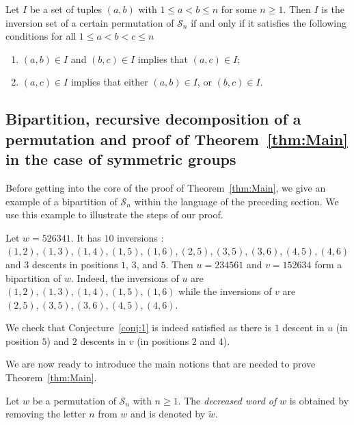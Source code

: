\documentclass[Unicode]{cedram-alco}
\theoremstyle{definition}
\newcommand{\Sym}[1]{\mathcal{S}_{#1}}
\newcommand{\Symn}{\Sym{n}}
\newcommand{\dec}[1]{\widetilde{#1}}
\begin{document}
\begin{prop}
\label{prop:invs}
Let $I$ be a set of tuples $(a,b)$ with $1 \leq a < b \leq n$ for some $n \geq 1$. Then $I$ is the inversion set of a certain permutation of $\Symn$ if and only if it satisfies the following conditions for all $1 \leq a < b < c \leq n$

\begin{enumerate}
\item $(a,b) \in I$ and $(b,c) \in I$ implies that $(a,c) \in I$;
\label{prop-item:invs-trans}
\item $(a,c) \in I$ implies that either $(a,b) \in I$, or $(b,c) \in I$.
\label{prop-item:invs-planar}
\end{enumerate}
\end{prop}

\subsection{Bipartition, recursive decomposition of a permutation and proof of Theorem~\ref{thm:Main} in the case of symmetric groups}

Before getting into the core of the proof of Theorem~\ref{thm:Main}, we give an example of a bipartition of $\Symn$ within the language of the preceding section. We use this example to illustrate the steps of our proof. 


\begin{ex}\label{ex:TypeA} 
Let $w = 526341$. It has $10$ inversions : $(1,2), (1,3), (1,4), (1,5), (1,6), (2,5), (3,5), (3,6), (4,5), (4,6)$ and $3$ descents in positions $1$, $3$, and $5$. Then $u = 234561$ and $v = 152634$ form a bipartition of $w$. Indeed, the inversions of $u$ are $(1,2),  (1,3), (1,4), (1,5), (1,6)$ while the inversions of $v$ are $(2,5), (3,5), (3,6), (4,5), (4,6)$.

We check that Conjecture~\ref{conj:1} is indeed satisfied as there is $1$ descent in $u$ (in position $5$) and $2$ descents in $v$ (in positions $2$ and $4$). 
\end{ex}


We are now ready to introduce  the main notions that are needed to prove Theorem~\ref{thm:Main}. 

\begin{defi}
Let $w$ be a permutation of $\Symn$ with $n \geq 1$. The \emph{decreased word of}  $w$ is obtained by removing the letter $n$ from $w$ and is denoted by $\dec{w}$.
\end{defi}
\end{document}
